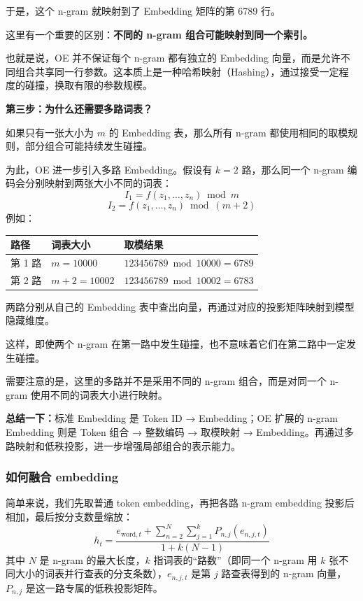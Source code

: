 \documentclass[11pt]{article}
\begin{document}
于是，这个 n-gram 就映射到了 Embedding 矩阵的第 6789 行。

这里有一个重要的区别：\textbf{不同的 n-gram 组合可能映射到同一个索引。}

也就是说，OE 并不保证每个 n-gram 都有独立的 Embedding 向量，而是允许不同组合共享同一行参数。这本质上是一种哈希映射（Hashing），通过接受一定程度的碰撞，换取有限的参数规模。

\textbf{第三步：为什么还需要多路词表？}

如果只有一张大小为 $m$ 的 Embedding 表，那么所有 n-gram 都使用相同的取模规则，部分组合可能持续发生碰撞。

为此，OE 进一步引入多路 Embedding。假设有 $k=2$ 路，那么同一个 n-gram 编码会分别映射到两张大小不同的词表：
\[
  I_1=f(z_1,\ldots,z_n)\bmod m
\]
\[
  I_2=f(z_1,\ldots,z_n)\bmod (m+2)
\]
例如：

\begin{table}[htbp]
  \centering
  \small
  \begin{tabular}{p{4.0cm}p{5.0cm}p{6.0cm}}
    \hline
    \textbf{路径} & \textbf{词表大小} & \textbf{取模结果} \\
    \hline
    第 1 路 & $m=10000$ & $123456789 \bmod 10000 = 6789$ \\
    \hline
    第 2 路 & $m+2=10002$ & $123456789 \bmod 10002 = 6783$ \\
    \hline
  \end{tabular}
\end{table}

两路分别从自己的 Embedding 表中查出向量，再通过对应的投影矩阵映射到模型隐藏维度。

这样，即使两个 n-gram 在第一路中发生碰撞，也不意味着它们在第二路中一定发生碰撞。

需要注意的是，这里的多路并不是采用不同的 n-gram 组合，而是对同一个 n-gram 使用不同的词表大小进行映射。

\textbf{总结一下：}标准 Embedding 是 Token ID → Embedding；OE 扩展的 n-gram Embedding 则是 Token 组合 → 整数编码 → 取模映射 → Embedding。再通过多路映射和低秩投影，进一步增强局部组合的表示能力。

\subsubsection{如何融合 embedding}

简单来说，我们先取普通 token embedding，再把各路 n-gram embedding 投影后相加，最后按分支数量缩放：
\[
  h_t=\frac{e_{\mathrm{word},t}+\sum_{n=2}^{N}\sum_{j=1}^{k}P_{n,j}(e_{n,j,t})}{1+k(N-1)}
\]
其中 $N$ 是 n-gram 的最大长度，$k$ 指词表的“路数”（即同一个 n-gram 用 $k$ 张不同大小的词表并行查表的分支条数），$e_{n,j,t}$ 是第 $j$ 路查表得到的 n-gram 向量，$P_{n,j}$ 是这一路专属的低秩投影矩阵。
\end{document}
